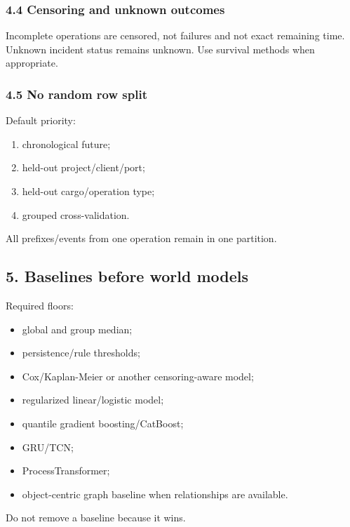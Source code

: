 \documentclass[
  spanish,
  10pt,
  a4paper,
]{article}
\providecommand{\tightlist}{%
  \setlength{\itemsep}{0pt}\setlength{\parskip}{0pt}}
\begin{document}
\subsubsection{4.4 Censoring and unknown
outcomes}\label{44-censoring-and-unknown-outcomes}

Incomplete operations are censored, not failures and not exact remaining
time. Unknown incident status remains unknown. Use survival methods when
appropriate.

\subsubsection{4.5 No random row split}\label{45-no-random-row-split}

Default priority:

\begin{enumerate}
\def\labelenumi{\arabic{enumi}.}
\tightlist
\item
  chronological future;
\item
  held-out project/client/port;
\item
  held-out cargo/operation type;
\item
  grouped cross-validation.
\end{enumerate}

All prefixes/events from one operation remain in one partition.

\subsection{5. Baselines before world
models}\label{5-baselines-before-world-models}

Required floors:

\begin{itemize}
\tightlist
\item
  global and group median;
\item
  persistence/rule thresholds;
\item
  Cox/Kaplan-Meier or another censoring-aware model;
\item
  regularized linear/logistic model;
\item
  quantile gradient boosting/CatBoost;
\item
  GRU/TCN;
\item
  ProcessTransformer;
\item
  object-centric graph baseline when relationships are available.
\end{itemize}

Do not remove a baseline because it wins.
\end{document}
